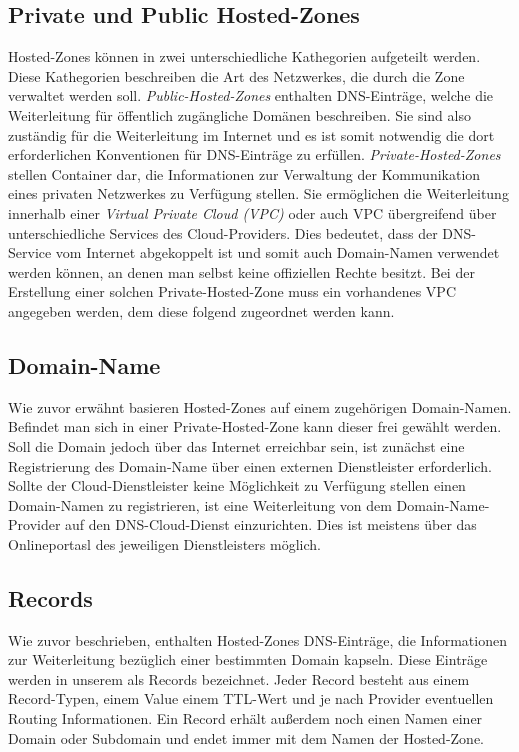 \subsection{Private und Public Hosted-Zones}
Hosted-Zones können in zwei unterschiedliche Kathegorien aufgeteilt werden. Diese Kathegorien beschreiben die Art des Netzwerkes, die durch die Zone verwaltet werden soll. \textit{Public-Hosted-Zones} enthalten DNS-Einträge, welche die Weiterleitung für öffentlich zugängliche Domänen beschreiben. Sie sind also zuständig für die Weiterleitung im Internet und es ist somit notwendig die dort erforderlichen Konventionen für DNS-Einträge zu erfüllen.
\textit{Private-Hosted-Zones} stellen Container dar, die Informationen zur Verwaltung der Kommunikation eines privaten Netzwerkes zu Verfügung stellen. Sie ermöglichen die Weiterleitung innerhalb einer \textit{Virtual Private Cloud (VPC)} oder auch VPC übergreifend über unterschiedliche Services des Cloud-Providers. Dies bedeutet, dass der DNS-Service vom Internet abgekoppelt ist und somit auch Domain-Namen verwendet werden können, an denen man selbst keine offiziellen Rechte besitzt. Bei der Erstellung einer solchen Private-Hosted-Zone muss ein vorhandenes VPC angegeben werden, dem diese folgend zugeordnet werden kann.

\subsection{Domain-Name}
Wie zuvor erwähnt basieren Hosted-Zones auf einem zugehörigen Domain-Namen. Befindet man sich in einer Private-Hosted-Zone kann dieser frei gewählt werden. Soll die Domain jedoch über das Internet erreichbar sein, ist zunächst eine Registrierung des Domain-Name über einen externen Dienstleister erforderlich. Sollte der Cloud-Dienstleister keine Möglichkeit zu Verfügung stellen einen Domain-Namen zu registrieren, ist eine Weiterleitung von dem Domain-Name-Provider auf den DNS-Cloud-Dienst einzurichten. Dies ist meistens über das Onlineportasl des jeweiligen Dienstleisters möglich.

\subsection{Records}
Wie zuvor beschrieben, enthalten Hosted-Zones DNS-Einträge, die Informationen zur Weiterleitung bezüglich einer bestimmten Domain kapseln. Diese Einträge werden in unserem als Records bezeichnet. Jeder Record besteht aus einem Record-Typen, einem Value einem TTL-Wert und je nach Provider eventuellen Routing Informationen. Ein Record erhält außerdem noch einen Namen einer Domain oder Subdomain und endet immer mit dem Namen der Hosted-Zone.

